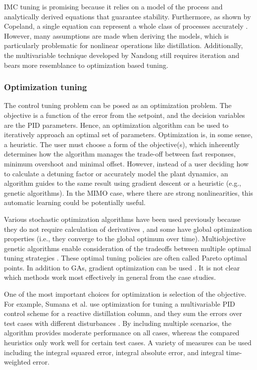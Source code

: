 IMC tuning is promising because it relies on a model of the process and analytically derived equations that guarantee stability. Furthermore, as shown by Copeland, a single equation can represent a whole class of processes accurately \cite{Copeland2010}. However, many assumptions are made when deriving the models, which is particularly problematic for nonlinear operations like distillation. Additionally, the multivariable technique developed by Nandong\cite{Nandong2015} still requires iteration and bears more resemblance to optimization based tuning.

\subsubsection{Optimization tuning}
The control tuning problem can be posed as an optimization problem.  The objective is a function of the error from the setpoint\cite{Pajares2019, Sumana2010, Rajapandiyan2012, Behroozsarand2012}, and the decision variables  are the PID parameters.  Hence, an optimization algorithm can be used to iteratively approach an optimal set of parameters. Optimization is, in some sense, a heuristic. The user must choose a form of the objective(s), which inherently determines how the algorithm manages the trade-off between fast responses, minimum overshoot and minimal offset. However, instead of a user deciding how to calculate a detuning factor or accurately model the plant dynamics, an algorithm guides to the same result using gradient descent or a heuristic (e.g., genetic algorithms). In the MIMO case, where there are strong nonlinearities, this automatic learning could be potentially useful. 

Various stochastic optimization algorithms have been used previously because they do not require calculation of derivatives \cite{Sumana2010, Ganesh2010, Behroozsarand2012}, and some have global optimization properties (i.e., they converge to the global optimum over time). Multiobjective genetic algorithms enable consideration of the tradeoffs between multiple optimal tuning strategies \cite{Behroozsarand2012, Pajares2019}. These optimal tuning policies are often called Pareto optimal points. In addition to GAs, gradient optimization can be used \cite{Sommer2011}. It is not clear which methods work most effectively in general from the case studies.

One of the most important choices for optimization is selection of the objective. For example, Sumana et al. use optimization for tuning a multivariable PID control scheme for a reactive distillation column, and they sum the errors over  test cases with different disturbances \cite{Sumana2010}. By including multiple scenarios, the algorithm provides moderate performance on all cases, whereas the compared heuristics only work well for certain test cases. A variety of measures can be used including the integral squared error, integral absolute error, and integral time-weighted error. 

